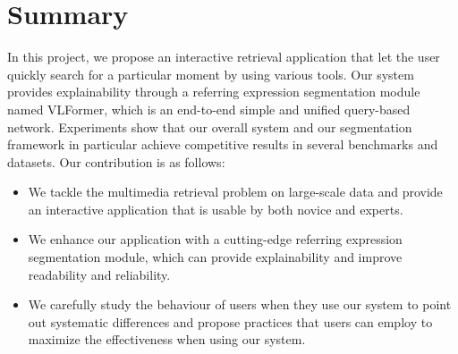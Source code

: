 


\section{Summary}
In this project, we propose an interactive retrieval application that let the user quickly search for a particular moment by using various tools. Our system provides explainability through a referring expression segmentation module named VLFormer, which is an end-to-end simple and unified query-based network. Experiments show that our overall system and our segmentation framework in particular achieve competitive results in several benchmarks and datasets. Our contribution is as follows:
\begin{itemize}
    \item We tackle the multimedia retrieval problem on large-scale data and provide an interactive application that is usable by both novice and experts.
    \item We enhance our application with a cutting-edge referring expression segmentation module, which can provide explainability and improve readability and reliability.
    \item We carefully study the behaviour of users when they use our system to point out systematic differences and propose practices that users can employ to maximize the effectiveness when using our system.
\end{itemize}

